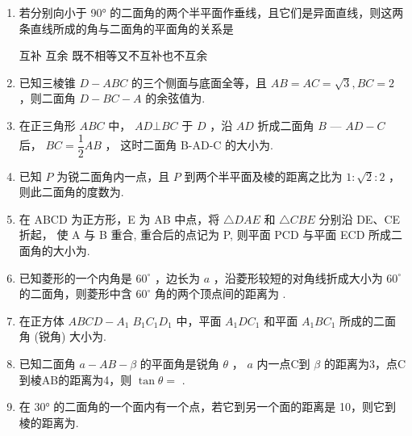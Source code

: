 \begin{enumerate}


\item 若分别向小于 90° 的二面角的两个半平面作垂线，且它们是异面直线，则这两条直线所成的角与二面角的平面角的关系是 

 {互补} {互余} {既不相等又不互补也不互余}



\item 已知三棱锥 $ D - {ABC} $ 的三个侧面与底面全等，且 $ {AB} = {AC} = \sqrt{3},{BC} = 2 $ ，则二面角 $ D - {BC} - A $ 的余弦值为.


\item 在正三角形 $ {ABC} $ 中， $ {AD}\bot {BC} $ 于 $ D $ ，沿 $ {AD} $ 折成二面角 $ B $ — $ {AD} - C $ 后， $ {BC} = \dfrac{1}{2}{AB} $ ， 这时二面角 B-AD-C 的大小为.


\item 已知 $ P $ 为锐二面角内一点，且 $ P $ 到两个半平面及棱的距离之比为 $ 1 : \sqrt{2} : 2 $ ，则此二面角的度数为.


\item 在 ABCD 为正方形，E 为 AB 中点，将 $ \bigtriangleup  {DAE} $ 和 $ \bigtriangleup  {CBE} $ 分别沿 DE、CE 折起， 使 A 与 B 重合, 重合后的点记为 P, 则平面 PCD 与平面 ECD 所成二面角的大小为.



\item 已知菱形的一个内角是 $ {60}^{ \circ  } $ ，边长为 $ a $ ，沿菱形较短的对角线折成大小为 $ {60}^{ \circ  } $ 的二面角，则菱形中含 $ {60}^{ \circ  } $ 角的两个顶点间的距离为
.


\item 在正方体 $ {{ABCD}} - {{A}}_{1}{{\;B}}_{1}{{C}}_{1}{{D}}_{1} $ 中，平面 $ {{A}}_{1}{{{DC}}}_{1} $ 和平面 $ {{A}}_{1}{{{BC}}}_{1} $ 所成的二面角 (锐角) 大小为.




\item 已知二面角 $ a - {AB} - \beta $ 的平面角是锐角 $ \theta $ ， $ a $ 内一点C到 $ \beta $ 的距离为3，点C 到棱AB的距离为4，则 $ \tan \theta  = $ .



\item 在 30° 的二面角的一个面内有一个点，若它到另一个面的距离是 10，则它到棱的距离为.




\end{enumerate}
